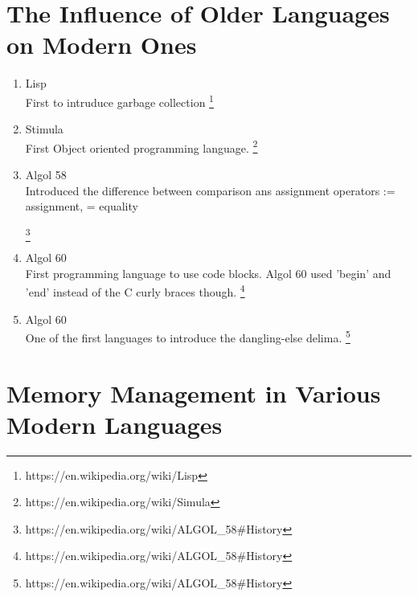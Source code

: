 \documentclass[11pt]{article}
\begin{document}
\newpage
\section{The Influence of Older Languages on Modern Ones}

\begin{enumerate}
\item Lisp\\
    First to intruduce garbage collection
    \footnote{https://en.wikipedia.org/wiki/Lisp}


\item Stimula\\
    First Object oriented programming language.
    \footnote{https://en.wikipedia.org/wiki/Simula}


\item Algol 58\\
    Introduced the difference between comparison ans assignment operators
        := assignment, = equality

    \footnote{https://en.wikipedia.org/wiki/ALGOL_58#History}

\item Algol 60\\
    First programming language to use code blocks.  Algol 60 used 'begin' and
        'end' instead of the C curly braces though.
    \footnote{https://en.wikipedia.org/wiki/ALGOL_58#History}

\item Algol 60\\
    One of the first languages to introduce the dangling-else delima.
    \footnote{https://en.wikipedia.org/wiki/ALGOL_58#History}

\end{enumerate}

\newpage
\section{Memory Management in Various Modern Languages}
\end{document}
